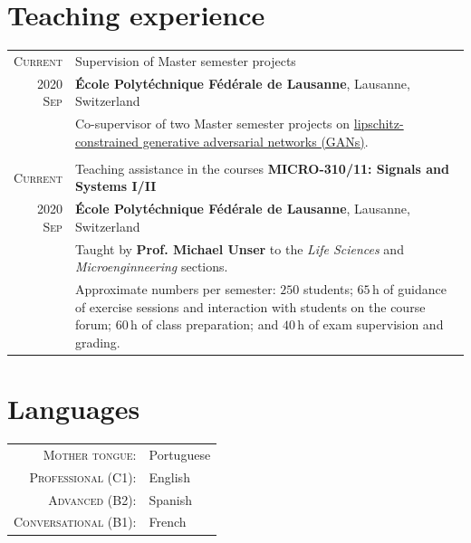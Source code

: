 \documentclass[a4paper,11pt]{article}
\begin{document}
  \section{Teaching experience}

    \begin{tabular}{r|p{13cm}}

      \textsc{Current}	 & Supervision of Master semester projects \\
      \textsc{2020 Sep}  & \footnotesize{\textbf{École Polytéchnique Fédérale de Lausanne}, Lausanne, Switzerland} \\
      & \footnotesize{Co-supervisor of two Master semester projects on \href{https://bigwww.epfl.ch/teaching/projects/abstract.html?f=00388}{lipschitz-constrained generative adversarial networks (GANs)}.} \\
      \multicolumn{2}{c}{} \\

	  \textsc{Current}     & Teaching assistance in the courses \textbf{MICRO-310/11: Signals and Systems I/II} \\
	  \textsc{2020 Sep} & \footnotesize{\textbf{École Polytéchnique Fédérale de Lausanne}, Lausanne, Switzerland} \\
    & \footnotesize{Taught by \textbf{Prof. Michael Unser} to the \emph{Life Sciences} and \emph{Microenginneering} sections.} \\
    & \footnotesize{Approximate numbers per semester:
              $250$ students;
              $65\,\mathrm{h}$ of guidance of exercise sessions and interaction with students on the course forum;
              $60\,\mathrm{h}$ of class preparation; and
							$40\,\mathrm{h}$ of exam supervision and grading.
              } \\

    \end{tabular}


    \vspace{25pt}

    \section{Languages}

      \begin{tabular}{rp{10cm}}

        \textsc{Mother tongue:} & Portuguese \\

        \textsc{Professional (C1):} & English \\

        \textsc{Advanced (B2):} & Spanish \\

        \textsc{Conversational (B1):} & French \\

      \end{tabular}
\end{document}

